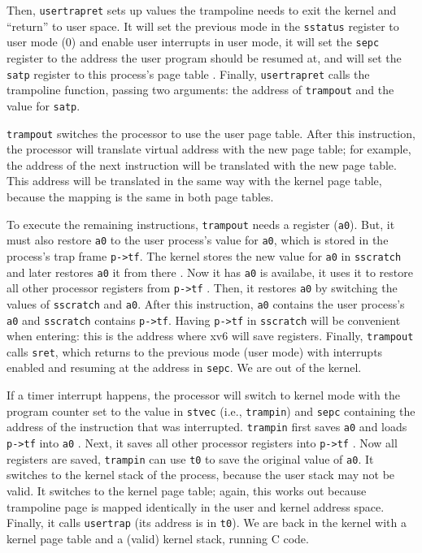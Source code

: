 Then, \lstinline{usertrapret} sets up values the trampoline needs to
exit the kernel and ``return'' to user space.  It will set the
previous mode in the \lstinline{sstatus} register to user mode (0) and
enable user interrupts in user mode, it will set the \lstinline{sepc}
register to the address the user program should be resumed at, and
will set the \lstinline{satp} register to this process's page table
.
Finally, \lstinline{usertrapret} calls
the trampoline function, passing two arguments: the address of
\lstinline{trampout} and the value for \lstinline{satp}.

\lstinline{trampout}  switches
the processor to use the user page table.  After this instruction, the
processor will translate virtual address with the new page table; for
example, the address of the next instruction will be translated with
the new page table.  This address will be translated in the same way
with the kernel page table, because the mapping is the same in both
page tables.

To execute the remaining instructions, \lstinline{trampout} needs a
register (\lstinline{a0}). But, it must also restore \lstinline{a0} to
the user process's value for \lstinline{a0}, which is stored in the
process's trap frame \lstinline{p->tf}.  The kernel stores the new
value for \lstinline{a0} in \lstinline{sscratch} and later restores
\lstinline{a0} it from there .
Now it has \lstinline{a0} is availabe, it uses it to restore all other
processor registers from \lstinline{p->tf}
.  Then, it restores
\lstinline{a0} by switching the values of \lstinline{sscratch} and
\lstinline{a0}. After this instruction, \lstinline{a0} contains the
user process's \lstinline{a0} and \lstinline{sscratch} contains
\lstinline{p->tf}.  Having \lstinline{p->tf} in \lstinline{sscratch}
will be convenient when entering: this is the address where xv6 will
save registers.  Finally, \lstinline{trampout} calls \lstinline{sret},
which returns to the previous mode (user mode) with interrupts enabled
and resuming at the address in \lstinline{sepc}.  We are out of the
kernel.

If a timer interrupt happens, the processor will switch to kernel mode
with the program counter set to the value in \lstinline{stvec} (i.e.,
\lstinline{trampin}) and \lstinline{sepc} containing the address of
the instruction that was interrupted.  \lstinline{trampin} first saves
\lstinline{a0} and loads \lstinline{p->tf} into \lstinline{a0}
.  Next, it saves all other
processor registers into \lstinline{p->tf}
.  Now all registers are
saved, \lstinline{trampin} can use \lstinline{t0} to save the original
value of \lstinline{a0}.  It switches to the kernel stack of the
process, because the user stack may not be valid.  It switches to the
kernel page table; again, this works out because trampoline page is
mapped identically in the user and kernel address space.  Finally, it
calls \lstinline{usertrap} (its address is in \lstinline{t0}).  We are
back in the kernel with a kernel page table and a (valid) kernel
stack, running C code.

